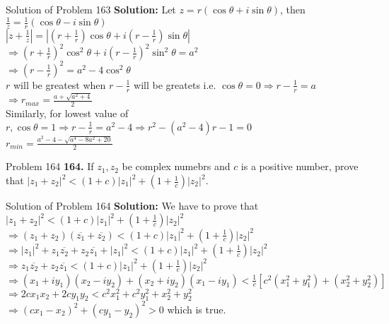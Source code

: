 \documentclass[aspectratio=169,8pt]{beamer}
\begin{document}
\begin{frame}{Solution of Problem 163}
  \textbf{Solution:} Let $z = r(\cos\theta + i\sin\theta)$, then $\frac{1}{z} = \frac{1}{r}(\cos\theta - i\sin\theta)$\\
  \vspace*{0.2cm}
  $\left|z + \frac{1}{z}\right| = \left|\left(r + \frac{1}{r}\right)\cos\theta + i\left(r - \frac{1}{r}\right)\sin\theta\right|$\\
  \vspace*{0.2cm}
  $\Rightarrow \left(r + \frac{1}{r}\right)^2\cos^2\theta + i\left(r - \frac{1}{r}\right)^2\sin^2\theta = a^2$\\
  \vspace*{0.2cm}
  $\Rightarrow \left(r - \frac{1}{r}\right)^2 = a^2 - 4\cos^2\theta$\\
  \vspace*{0.2cm}
  $r$ will be greatest when $r - \frac{1}{r}$ will be greatets i.e. $\cos\theta= 0 \Rightarrow r - \frac{1}{r} = a$\\
  \vspace*{0.2cm}
  $\Rightarrow r_{max} = \frac{a + \sqrt{a^2 + 4}}{2}$\\
  \vspace*{0.2cm}
  Similarly, for lowest value of $r, \cos\theta = 1 \Rightarrow r - \frac{1}{r} = a^2 - 4 \Rightarrow r^2 - (a^2 - 4)r - 1 = 0$\\
  \vspace*{0.2cm}
  $r_{min} = \frac{a^2- 4 - \sqrt{a^4 - 8a^2 + 20}}{2}$
\end{frame}
\begin{frame}{Problem 164}
  \textbf{164.} If $z_1, z_2$ be complex numebrs and $c$ is a positive number, prove that $|z_1 + z_2|^2 < (1 + c)|z_1|^2 + \left(1
  + \frac{1}{c}\right)|z_2|^2$.
\end{frame}
\begin{frame}{Solution of Problem 164}
  \textbf{Solution:} We have to prove that $|z_1 + z_2|^2 < (1 + c)|z_1|^2 + \left(1 + \frac{1}{c}\right)|z_2|^2$\\
  \vspace*{0.2cm}
  $\Rightarrow (z_1 + z_2)(\overline{z_1} + \overline{z_2}) < (1 + c)|z_1|^2 + \left(1 + \frac{1}{c}\right)|z_2|^2$\\
  \vspace*{0.2cm}
  $\Rightarrow |z_1|^2 + z_1\overline{z_2} + z_2\overline{z_1} + |z_1|^2 < (1 + c)|z_1|^2 + \left(1 + \frac{1}{c}\right)|z_2|^2$\\
  \vspace*{0.2cm}
  $\Rightarrow z_1\overline{z_2} + z_2\overline{z_1} < (1 + c)|z_1|^2 + \left(1 + \frac{1}{c}\right)|z_2|^2$\\
  \vspace*{0.2cm}
  $\Rightarrow (x_1 + iy_1)(x_2 - iy_2) + (x_2 + iy_2)(x_1 - iy_1) < \frac{1}{c}[c^2(x_1^2 + y_1^2) + (x_2^2 + y_2^2)]$\\
  \vspace*{0.2cm}
  $\Rightarrow 2cx_1x_2 + 2cy_1y_2 < c^2x_1^2 + c^2y_1^2 + x_2^2 + y_2^2$\\
  \vspace*{0.2cm}
  $\Rightarrow (cx_1 - x_2)^2 + (cy_1 - y_2)^2 > 0$ which is true.
\end{frame}
\end{document}
